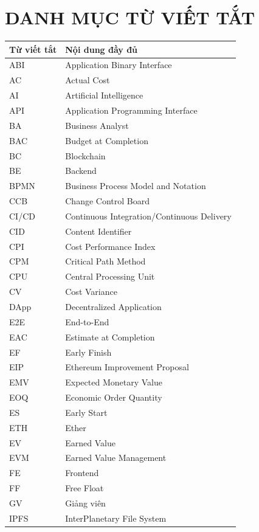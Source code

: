 \chapter*{DANH MỤC TỪ VIẾT TẮT}

\begin{longtable}{p{3cm}p{10.5cm}}
\toprule
\textbf{Từ viết tắt} & \textbf{Nội dung đầy đủ} \\
\midrule
ABI & Application Binary Interface \\
AC & Actual Cost \\
AI & Artificial Intelligence \\
API & Application Programming Interface \\
BA & Business Analyst \\
BAC & Budget at Completion \\
BC & Blockchain \\
BE & Backend \\
BPMN & Business Process Model and Notation \\
CCB & Change Control Board \\
CI/CD & Continuous Integration/Continuous Delivery \\
CID & Content Identifier \\
CPI & Cost Performance Index \\
CPM & Critical Path Method \\
CPU & Central Processing Unit \\
CV & Cost Variance \\
DApp & Decentralized Application \\
E2E & End-to-End \\
EAC & Estimate at Completion \\
EF & Early Finish \\
EIP & Ethereum Improvement Proposal \\
EMV & Expected Monetary Value \\
EOQ & Economic Order Quantity \\
ES & Early Start \\
ETH & Ether \\
EV & Earned Value \\
EVM & Earned Value Management \\
FE & Frontend \\
FF & Free Float \\
GV & Giảng viên \\
IPFS & InterPlanetary File System \\

\end{longtable}
